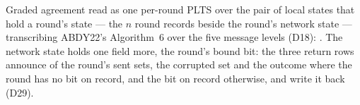 \begin{definition}
  \label{def:aba-gbca-impl}
  \leanok
  Graded agreement read as one per-round PLTS over the pair of local states that hold a round's state --- the $n$ round records beside the round's network state --- transcribing ABDY22's Algorithm~6 over the five message levels (D18): .
  The network state holds one field more, the round's bound bit: the three return rows announce  of the round's sent sets, the corrupted set and the outcome where the round has no bit on record, and the bit on record otherwise, and write it back (D29).
\end{definition}
